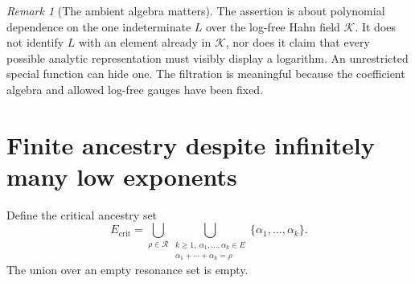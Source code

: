 \documentclass[11pt,a4paper]{article}
\numberwithin{equation}{section}
\theoremstyle{definition}
\theoremstyle{remark}
\newtheorem{remark}[theorem]{Remark}
\newcommand{\K}{\mathcal K}
\newcommand{\Res}{\mathcal R}
\begin{document}
\begin{remark}[The ambient algebra matters]
The assertion is about polynomial dependence on the one indeterminate
$L$ over the log-free Hahn field $\K$. It does not identify $L$ with an
element already in $\K$, nor does it claim that every possible analytic
representation must visibly display a logarithm. An unrestricted special
function can hide one. The filtration is meaningful because the coefficient
algebra and allowed log-free gauges have been fixed.
\end{remark}

\section{Finite ancestry despite infinitely many low exponents}
\label{sec:ancestry}

Define the critical ancestry set
\begin{equation}\label{eq:critical-set}
 E_{\mathrm{crit}}=
 \bigcup_{\rho\in\Res}
 \bigcup_{\substack{k\geq1,\ \alpha_1,\ldots,\alpha_k\in E\\
                       \alpha_1+\cdots+\alpha_k=\rho}}
       \{\alpha_1,\ldots,\alpha_k\}.
\end{equation}
The union over an empty resonance set is empty.
\end{document}
